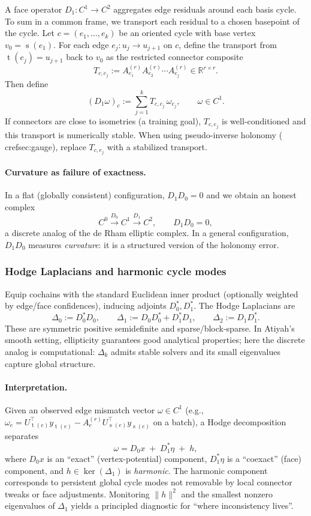 \documentclass[11pt]{article}
\theoremstyle{definition}
\theoremstyle{plain}
\theoremstyle{remark}
\newcommand{\R}{\mathbb{R}}
\newcommand{\src}{\operatorname{s}}
\newcommand{\tgt}{\operatorname{t}}
\begin{document}
A face operator $D_1:C^1\to C^2$ aggregates edge residuals around each basis cycle.
To sum in a common frame, we transport each residual to a chosen basepoint of the cycle.
Let $c=(e_1,\ldots,e_k)$ be an oriented cycle with base vertex $v_0=\src(e_1)$.
For each edge $e_j:u_j\to u_{j+1}$ on $c$, define the transport from $\tgt(e_j)=u_{j+1}$ back to $v_0$ as the restricted connector composite
\[
T_{c,e_j} := A_{e_1}^{(r)} A_{e_2}^{(r)}\cdots A_{e_{j}}^{(r)} \in \R^{r\times r}.
\]
Then define
\[
(D_1 \omega)_c := \sum_{j=1}^{k} T_{c,e_j}\,\omega_{e_j},
\qquad \omega\in C^1.
\]
If connectors are close to isometries (a training goal), $T_{c,e_j}$ is well-conditioned and this transport is numerically stable.
When using pseudo-inverse holonomy (\\cref{sec:gauge}), replace $T_{c,e_j}$ with a stabilized transport.

\paragraph{Curvature as failure of exactness.}
In a flat (globally consistent) configuration, $D_1 D_0 = 0$ and we obtain an honest complex
\[
C^0 \xrightarrow{D_0} C^1 \xrightarrow{D_1} C^2,
\qquad D_1D_0=0,
\]
a discrete analog of the de Rham elliptic complex.
In a general configuration, $D_1D_0$ measures \emph{curvature}: it is a structured version of the holonomy error.

\subsubsection{Hodge Laplacians and harmonic cycle modes}
Equip cochains with the standard Euclidean inner product (optionally weighted by edge/face confidences), inducing adjoints $D_0^\ast,D_1^\ast$.
The Hodge Laplacians are
\[
\Delta_0 := D_0^\ast D_0,\qquad
\Delta_1 := D_0 D_0^\ast + D_1^\ast D_1,\qquad
\Delta_2 := D_1 D_1^\ast.
\]
These are symmetric positive semidefinite and sparse/block-sparse.
In Atiyah's smooth setting, ellipticity guarantees good analytical properties; here the discrete analog is computational: $\Delta_k$ admits stable solvers and its small eigenvalues capture global structure.

\paragraph{Interpretation.}
Given an observed edge mismatch vector $\omega\in C^1$ (e.g., $\omega_e = U_{\tgt(e)}^\top y_{\tgt(e)} - A_e^{(r)} U_{\src(e)}^\top y_{\src(e)}$ on a batch),
a Hodge decomposition separates
\[
\omega = D_0 x \;+\; D_1^\ast \eta \;+\; h,
\]
where $D_0 x$ is an ``exact'' (vertex-potential) component, $D_1^\ast\eta$ is a ``coexact'' (face) component, and $h\in\ker(\Delta_1)$ is \emph{harmonic}.
The harmonic component corresponds to persistent global cycle modes not removable by local connector tweaks or face adjustments.
Monitoring $\|h\|^2$ and the smallest nonzero eigenvalues of $\Delta_1$ yields a principled diagnostic for ``where inconsistency lives''.
\end{document}

